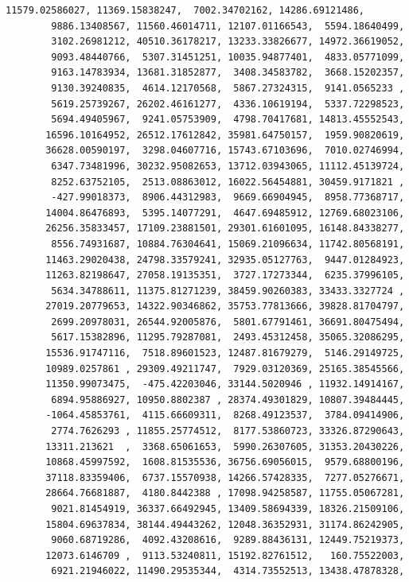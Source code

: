 \documentclass[11pt,a4paper]{report}
\begin{document}
\begin{tcolorbox}[breakable, size=fbox, boxrule=.5pt, pad at break*=1mm, opacityfill=0]
\begin{Verbatim}[commandchars=\\\{\}]
       11579.02586027, 11369.15838247,  7002.34702162, 14286.69121486,
        9886.13408567, 11560.46014711, 12107.01166543,  5594.18640499,
        3102.26981212, 40510.36178217, 13233.33826677, 14972.36619052,
        9093.48440766,  5307.31451251, 10035.94877401,  4833.05771099,
        9163.14783934, 13681.31852877,  3408.34583782,  3668.15202357,
        9130.39240835,  4614.12170568,  5867.27324315,  9141.0565233 ,
        5619.25739267, 26202.46161277,  4336.10619194,  5337.72298523,
        5694.49405967,  9241.05753909,  4798.70417681, 14813.45552543,
       16596.10164952, 26512.17612842, 35981.64750157,  1959.90820619,
       36628.00590197,  3298.04607716, 15743.67103696,  7010.02746994,
        6347.73481996, 30232.95082653, 13712.03943065, 11112.45139724,
        8252.63752105,  2513.08863012, 16022.56454881, 30459.9171821 ,
        -427.99018373,  8906.44312983,  9669.66904945,  8958.77368717,
       14004.86476893,  5395.14077291,  4647.69485912, 12769.68023106,
       26256.35833457, 17109.23881501, 29301.61601095, 16148.84338277,
        8556.74931687, 10884.76304641, 15069.21096634, 11742.80568191,
       11463.29020438, 24798.33579241, 32935.05127763,  9447.01284923,
       11263.82198647, 27058.19135351,  3727.17273344,  6235.37996105,
        5634.34788611, 11375.81271239, 38459.90260383, 33433.3327724 ,
       27019.20779653, 14322.90346862, 35753.77813666, 39828.81704797,
        2699.20978031, 26544.92005876,  5801.67791461, 36691.80475494,
        5617.15382896, 11295.79287081,  2493.45312458, 35065.32086295,
       15536.91747116,  7518.89601523, 12487.81679279,  5146.29149725,
       10989.0257861 , 29309.49211747,  7929.03120369, 25165.38545566,
       11350.99073475,  -475.42203046, 33144.5020946 , 11932.14914167,
        6894.95886927, 10950.8802387 , 28374.49301829, 10807.39484445,
       -1064.45853761,  4115.66609311,  8268.49123537,  3784.09414906,
        2774.7626293 , 11855.25774512,  8177.53860723, 33326.87290643,
       13311.213621  ,  3368.65061653,  5990.26307605, 31353.20430226,
       10868.45997592,  1608.81535536, 36756.69056015,  9579.68800196,
       37118.83359406,  6737.15570938, 14266.57428335,  7277.05276671,
       28664.76681887,  4180.8442388 , 17098.94258587, 11755.05067281,
        9021.81454919, 36337.66492945, 13409.58694339, 18326.21509106,
       15804.69637834, 38144.49443262, 12048.36352931, 31174.86242905,
        9060.68719286,  4092.43208616,  9289.88436131, 12449.75219373,
       12073.6146709 ,  9113.53240811, 15192.82761512,   160.75522003,
        6921.21946022, 11490.29535344,  4314.73552513, 13438.47878328,

\end{Verbatim}
\end{tcolorbox}
\end{document}
